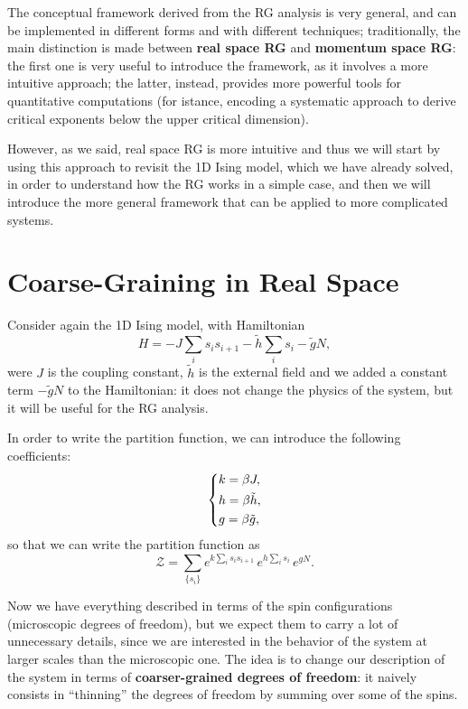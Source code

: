 The conceptual framework derived from the RG analysis is very general, and can be implemented in different forms and with different techniques; traditionally, the main distinction is made between \textbf{real space RG} and \textbf{momentum space RG}: the first one is very useful to introduce the framework, as it involves a more intuitive approach; the latter, instead, provides more powerful tools for quantitative computations (for istance, encoding a systematic approach to derive critical exponents below the upper critical dimension).

However, as we said, real space RG is more intuitive and thus we will start by using this approach to revisit the 1D Ising model, which we have already solved, in order to understand how the RG works in a simple case, and then we will introduce the more general framework that can be applied to more complicated systems.

\section{Coarse-Graining in Real Space}

Consider again the 1D Ising model, with Hamiltonian
\[
    H = - J \sum_{i} s_i s_{i+1} - \tilde{h} \sum_i s_i - \tilde{g}N,
\]
were \(J\) is the coupling constant, \(\tilde{h}\) is the external field and we added a constant term \(-\tilde{g}N\) to the Hamiltonian: it does not change the physics of the system, but it will be useful for the RG analysis.

In order to write the partition function, we can introduce the following coefficients:
\[
    \begin{dcases}
        k = \beta J,         \\
        h = \beta \tilde{h}, \\
        g = \beta \tilde{g},
    \end{dcases}
\]
so that we can write the partition function as
\[
    \mathcal{Z} = \sum_{\{s_i\}} e^{k \sum_i s_i s_{i+1}} \, e^{h \sum_i s_i} \, e^{g N}.
\]

Now we have everything described in terms of the spin configurations (microscopic degrees of freedom), but we expect them to carry a lot of unnecessary details, since we are interested in the behavior of the system at larger scales than the microscopic one. The idea is to change our description of the system in terms of \textbf{coarser-grained degrees of freedom}: it naively consists in ``thinning'' the degrees of freedom by summing over some of the spins.

